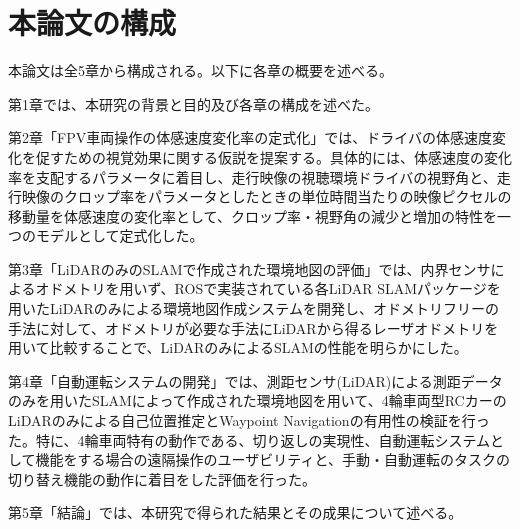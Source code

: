 \section{本論文の構成}

本論文は全5章から構成される。以下に各章の概要を述べる。

第1章では、本研究の背景と目的及び各章の構成を述べた。

第2章「FPV車両操作の体感速度変化率の定式化」では、ドライバの体感速度変化を促すための視覚効果に関する仮説を提案する。具体的には、体感速度の変化率を支配するパラメータに着目し、走行映像の視聴環境ドライバの視野角と、走行映像のクロップ率をパラメータとしたときの単位時間当たりの映像ピクセルの移動量を体感速度の変化率として、クロップ率・視野角の減少と増加の特性を一つのモデルとして定式化した。

第3章「LiDARのみのSLAMで作成された環境地図の評価」では、内界センサによるオドメトリを用いず、ROSで実装されている各LiDAR SLAMパッケージを用いたLiDARのみによる環境地図作成システムを開発し、オドメトリフリーの手法に対して、オドメトリが必要な手法にLiDARから得るレーザオドメトリを用いて比較することで、LiDARのみによるSLAMの性能を明らかにした。

第4章「自動運転システムの開発」では、測距センサ(LiDAR)による測距データのみを用いたSLAMによって作成された環境地図を用いて、4輪車両型RCカーのLiDARのみによる自己位置推定とWaypoint Navigationの有用性の検証を行った。特に、4輪車両特有の動作である、切り返しの実現性、自動運転システムとして機能をする場合の遠隔操作のユーザビリティと、手動・自動運転のタスクの切り替え機能の動作に着目をした評価を行った。

第5章「結論」では、本研究で得られた結果とその成果について述べる。

